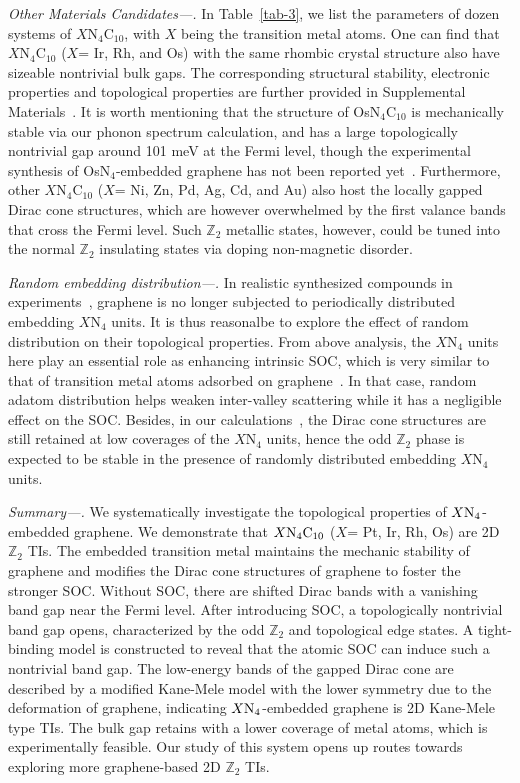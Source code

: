 \documentclass[aps,prl,twocolumn,showpacs,superscriptaddress]{revtex4-1}
\begin{document}
\textit{Other Materials Candidates---.} In Table~\ref{tab-3}, we list the parameters of dozen systems of $X$N$_4$C$_{10}$, with $X$ being the transition metal atoms. One can find that $X$N$_4$C$_{10}$ ($X$= Ir, Rh, and Os) with the same rhombic crystal structure also have sizeable nontrivial bulk gaps. The corresponding structural stability, electronic properties and topological properties are further provided in Supplemental Materials~\cite{ref52}. It is worth mentioning that the structure of OsN$_4$C$_{10}$ is mechanically stable via our phonon spectrum calculation, and has a large topologically nontrivial gap around 101 meV at the Fermi level, though the experimental synthesis of OsN$_4$-embedded graphene has not been reported yet~\cite{ref20}. Furthermore, other $X$N$_4$C$_{10}$ ($X$= Ni, Zn, Pd, Ag, Cd, and Au) also host the locally gapped Dirac cone structures, which are however overwhelmed by the first valance bands that cross the Fermi level. Such $\mathbb{Z}_2$ metallic states, however, could be tuned into the normal $\mathbb{Z}_2$ insulating states via doping non-magnetic disorder.

\textit{Random embedding distribution---.} In realistic synthesized compounds in experiments~\cite {ref18,ref19,ref21,ref20}, graphene is no longer subjected to periodically distributed embedding $X$N$_4$ units. It is thus reasonalbe to explore the effect of random distribution on their topological properties. From above analysis, the $X$N$_4$ units here play an essential role as enhancing intrinsic SOC, which is very similar to that of transition metal atoms adsorbed on graphene~\cite{ref11,ref54}. In that case, random adatom distribution helps weaken inter-valley scattering while it has a negligible effect on the SOC. Besides, in our calculations~\cite{ref52}, the Dirac cone structures are still retained at low coverages of the $X$N$_4$ units, hence the odd $\mathbb{Z}_2$ phase is expected to be stable in the presence of randomly distributed embedding $X$N$_4$ units.

\textit{Summary---.} We systematically investigate the topological properties of $X{\rm N_4}$-embedded graphene. We demonstrate that ${X\rm N_4C_{10}}$ ($X$= Pt, Ir, Rh, Os) are 2D $\mathbb{Z}_2$ TIs. The embedded transition metal maintains the mechanic stability of graphene and modifies the Dirac cone structures of graphene to foster the stronger SOC. Without SOC, there are shifted Dirac bands with a vanishing band gap near the Fermi level. After introducing SOC, a topologically nontrivial band gap opens, characterized by the odd $\mathbb{Z}_2$ and topological edge states. A tight-binding model is constructed to reveal that the atomic SOC can induce such a nontrivial band gap. The low-energy bands of the gapped Dirac cone are described by a modified Kane-Mele model with the lower symmetry due to the deformation of graphene, indicating $X{\rm N_4}$-embedded graphene is 2D Kane-Mele type TIs. The bulk gap retains with a lower coverage of metal atoms, which is experimentally feasible. Our study of this system opens up routes towards exploring more graphene-based 2D $\mathbb{Z}_2$ TIs.
\end{document}
